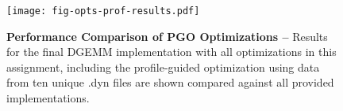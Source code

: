 
\begin{figure}[h]

  \centering
  \texttt{[image: fig-opts-prof-results.pdf]}

  \caption{\textbf{Performance Comparison of PGO Optimizations --}
    Results for the final DGEMM implementation with all optimizations in
    this assignment, including the profile-guided optimization using data
    from ten unique .dyn files are shown compared against all provided
    implementations.}

  \label{fig-opts-prof-results}

\end{figure}
